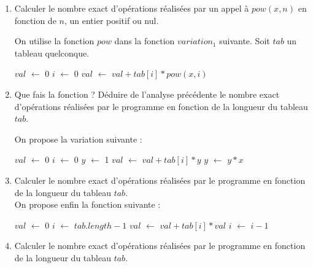 \documentclass{article}[12pt]
\newcommand*\Let[2]{\State #1 $\gets$ #2}
\begin{document}
  
 \begin{enumerate}

  \item Calculer le nombre exact d'opérations réalisées par un appel à $pow(x,n)$ en fonction de $n$, un entier positif ou nul.
  
  On utilise la fonction $pow$ dans la fonction $variation_1$ suivante. Soit $tab$ un tableau quelconque.
  
  \begin{tcolorbox}
     \begin{algorithmic}[1]
    \Let{$val$}{0}
    \Let{$i$}{0}
        \Let{$val$}{$val + tab[i] * pow(x,i)$}
    \EndFor
    \EndFunction
  \end{algorithmic}
 \end{tcolorbox} 
    \newpage
  \item Que fais la fonction ? Déduire de l'analyse précédente le nombre exact d'opérations réalisées par le programme en fonction de la longueur du tableau $tab$.
  
  On propose la variation suivante :

 \begin{tcolorbox} 
       \begin{algorithmic}[1]
    \Let{$val$}{0}
    \Let{$i$}{0}
    \Let{$y$}{1}
        \Let{$val$}{$val + tab[i] * y$}
        \Let{$y$}{$y * x$}
    \EndFor
  \EndFunction
  \end{algorithmic}
\end{tcolorbox}
  
  \item Calculer le nombre exact d'opérations réalisées par le programme en fonction de la longueur du tableau $tab$.\\
  
  On propose enfin la fonction suivante :

\begin{tcolorbox}
         \begin{algorithmic}[1]
    \Let{$val$}{0}
    \Let{$i$}{$tab.length - 1$}
        \Let{$val$}{$val + tab[i] * val$}
        \Let{$i$}{$i - 1$}
    \EndFor
  \EndFunction
  \end{algorithmic}
\end{tcolorbox}

  
  \item Calculer le nombre exact d'opérations réalisées par le programme en fonction de la longueur du tableau $tab$.
  \end{enumerate}  
\end{document}
